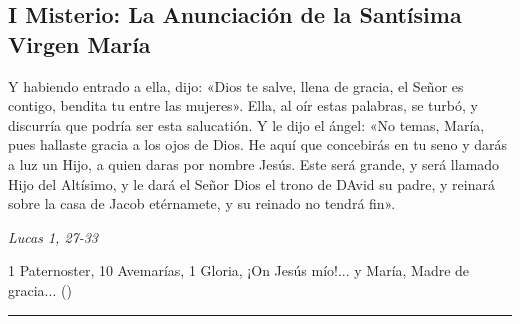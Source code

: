 \documentclass[11pt,a4paper]{book}
\begin{document}
    \subsection*{I Misterio: La Anunciación de la Santísima Virgen María}
    Y habiendo entrado a ella, dijo: «Dios te salve, llena de gracia, el Señor es contigo, bendita tu entre las mujeres». 
    Ella, al oír estas palabras, se turbó, y discurría que podría ser esta salucatión. Y le dijo el ángel: «No temas, María, 
    pues hallaste gracia a los ojos de Dios. He aquí que concebirás en tu seno y darás a luz un Hijo, a quien daras por 
    nombre Jesús. Este será grande, y será llamado Hijo del Altísimo, y le dará el Señor Dios el trono de DAvid su padre, 
    y reinará sobre la casa de Jacob etérnamete, y su reinado no tendrá fin».

    \begin{flushright}
        \emph{Lucas 1, 27-33}
    \end{flushright}

    1 Paternoster, 10 Avemarías, 1 Gloria, ¡On Jesús mío!... y María, Madre de gracia... ()

    \rule{\textwidth}{0.5pt}
    
\end{document}
